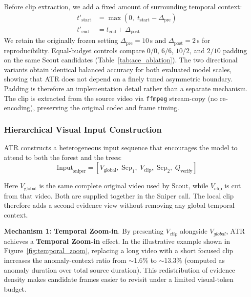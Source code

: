 Before clip extraction, we add a fixed amount of surrounding temporal context:
\begin{align}
  t'_{\text{start}} &= \max(0,\; t_{\text{start}} - \Delta_{\text{pre}}) \label{eq:ace_start}\\
  t'_{\text{end}}   &= t_{\text{end}} + \Delta_{\text{post}} \label{eq:ace_end}
\end{align}
We retain the originally frozen setting $\Delta_{\text{pre}} = 10$\,s and $\Delta_{\text{post}} = 2$\,s for reproducibility. Equal-budget controls compare $0/0$, $6/6$, $10/2$, and $2/10$ padding on the same Scout candidates (Table~\ref{tab:ace_ablation}). The two directional variants obtain identical balanced accuracy for both evaluated model scales, showing that ATR does not depend on a finely tuned asymmetric boundary. Padding is therefore an implementation detail rather than a separate mechanism.
The clip is extracted from the source video via \texttt{ffmpeg} stream-copy (no re-encoding), preserving the original codec and frame timing.

\subsubsection{Hierarchical Visual Input Construction}
\label{sec:input}

ATR constructs a heterogeneous input sequence that encourages the model to attend to both the forest and the trees:
\begin{equation}
  \text{Input}_{\text{sniper}} = [V_{\text{global}},\; \text{Sep}_1,\; V_{\text{clip}},\; \text{Sep}_2,\; Q_{\text{verify}}]
  \label{eq:sniper_input}
\end{equation}

Here $V_{\text{global}}$ is the same complete original video used by Scout, while $V_{\text{clip}}$ is cut from that video. Both are supplied together in the Sniper call. The local clip therefore adds a second evidence view without removing any global temporal context.

\textbf{Mechanism 1: Temporal Zoom-in}.
By presenting $V_{clip}$ alongside $V_{global}$, ATR achieves a \textbf{Temporal Zoom-in} effect. 
In the illustrative example shown in Figure~\ref{fig:temporal_zoom}, replacing a long video with a short focused clip increases the anomaly-context ratio from $\sim$1.6\% to $\sim$13.3\% (computed as anomaly duration over total source duration).
This redistribution of evidence density makes candidate frames easier to revisit under a limited visual-token budget.

